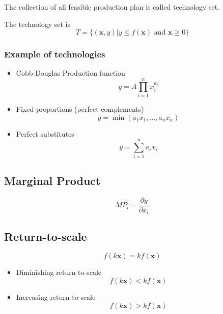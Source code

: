 \documentclass[a4paper] {scrartcl}
\begin{document}
The collection of all feasible production plan is called technology set.

The technology set is
\begin{equation}
	T = \{(\mathbf{x}, y)|y\leq f(\mathbf{x})\text{ and } \mathbf{x}\geq0\}
\end{equation}

\subsubsection{Example of technologies}
\begin{itemize}
	\item Cobb-Douglas Production function
	\begin{equation}
		y = A\prod_{i=1}^n x_i^{a_i}
	\end{equation}
	\item Fixed proportions (perfect complements)
	\begin{equation}
		y = \min(a_1x_1, ..., a_nx_n)
	\end{equation}
	\item Perfect substitutes
	\begin{equation}
		y = \sum_{i=1}^na_ix_i
	\end{equation}
\end{itemize}

\subsection{Marginal Product}
\begin{equation}
	MP_i = \frac{\partial y}{\partial x_i}
\end{equation}

\subsection{Return-to-scale}
\begin{equation}
	f(k \mathbf{x})=kf(\mathbf{x})
\end{equation}

\begin{itemize}
	\item Diminishing return-to-scale
	\begin{equation}
		f(k \mathbf{x})<kf(\mathbf{x})
	\end{equation}
	\item Increasing return-to-scale
	\begin{equation}
		f(k \mathbf{x})>kf(\mathbf{x})
	\end{equation}
\end{itemize}
\end{document}
